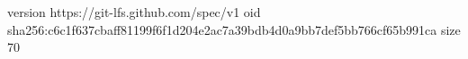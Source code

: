 version https://git-lfs.github.com/spec/v1
oid sha256:c6c1f637cbaff81199f6f1d204e2ac7a39bdb4d0a9bb7def5bb766cf65b991ca
size 70
